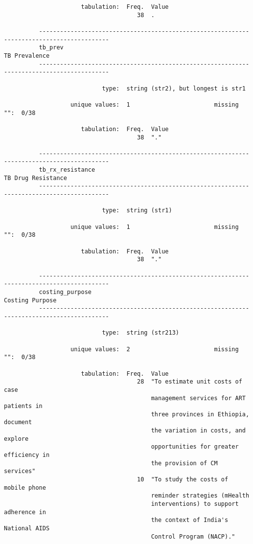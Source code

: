 \documentclass{article}
\begin{document}
\begin{verbatim}
                      tabulation:  Freq.  Value
                                      38  .
          
          ------------------------------------------------------------------------------------------
          tb_prev                                                                      TB Prevalence
          ------------------------------------------------------------------------------------------
          
                            type:  string (str2), but longest is str1
          
                   unique values:  1                        missing "":  0/38
          
                      tabulation:  Freq.  Value
                                      38  "."
          
          ------------------------------------------------------------------------------------------
          tb_rx_resistance                                                        TB Drug Resistance
          ------------------------------------------------------------------------------------------
          
                            type:  string (str1)
          
                   unique values:  1                        missing "":  0/38
          
                      tabulation:  Freq.  Value
                                      38  "."
          
          ------------------------------------------------------------------------------------------
          costing_purpose                                                            Costing Purpose
          ------------------------------------------------------------------------------------------
          
                            type:  string (str213)
          
                   unique values:  2                        missing "":  0/38
          
                      tabulation:  Freq.  Value
                                      28  "To estimate unit costs of case
                                          management services for ART patients in
                                          three provinces in Ethiopia, document
                                          the variation in costs, and explore
                                          opportunities for greater efficiency in
                                          the provision of CM services"
                                      10  "To study the costs of mobile phone
                                          reminder strategies (mHealth
                                          interventions) to support adherence in
                                          the context of India's National AIDS
                                          Control Program (NACP)."
          

\end{verbatim}
\end{document}
